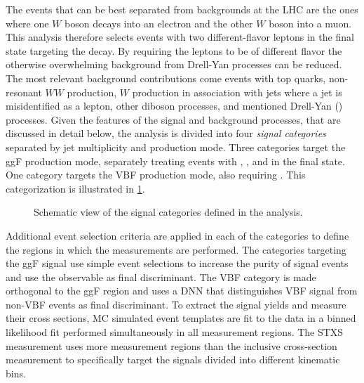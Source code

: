 The \HWW events that can be best separated from backgrounds at the LHC are the ones where one $W$ boson decays into an electron and the other $W$ boson into a muon.
This analysis therefore selects events with two different-flavor leptons in the final state targeting the \HWWdet decay.
By requiring the leptons to be of different flavor the otherwise overwhelming background from Drell-Yan processes can be reduced. 
The most relevant background contributions come events with top quarks, non-resonant $WW$ production, $W$ production in association with jets where a jet is misidentified as a lepton, other diboson processes, and mentioned Drell-Yan (\Zgamma) processes.
Given the features of the signal and background processes, that are discussed in detail below, the analysis is divided into four \emph{signal categories} separated by jet multiplicity and production mode.
Three categories target the ggF production mode, separately treating events with \ZeroJet, \OneJet, and \TwoJet in the final state. One category targets the VBF production mode, also requiring \TwoJet. 
This categorization is illustrated in \cref{fig:signal-categorization}. 
\begin{figure}
    \caption{Schematic view of the signal categories defined in the \HWW analysis.}
    \label{fig:signal-categorization}
\end{figure}
Additional event selection criteria are applied in each of the categories to define the regions in which the measurements are performed.
The categories targeting the ggF signal use simple event selections to increase the purity of signal events and use the \mT observable as final discriminant. 
The VBF \TwoJet category is made orthogonal to the ggF \TwoJet region and uses a DNN that distinguishes VBF signal from non-VBF events as final discriminant.
To extract the signal yields and measure their cross sections, MC simulated event templates are fit to the data in a binned likelihood fit performed simultaneously in all measurement regions.
The STXS measurement uses more measurement regions than the inclusive cross-section measurement to specifically target the signals divided into different kinematic bins. 

